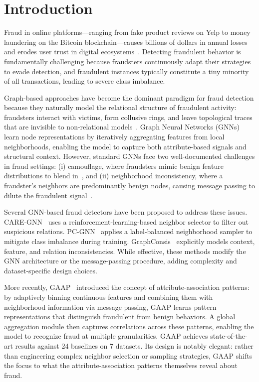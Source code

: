 \section{Introduction}
\label{sec:introduction}

Fraud in online platforms---ranging from fake product reviews on Yelp to money laundering on the Bitcoin blockchain---causes billions of dollars in annual losses and erodes user trust in digital ecosystems~\cite{wang2019fdgars}. Detecting fraudulent behavior is fundamentally challenging because fraudsters continuously adapt their strategies to evade detection, and fraudulent instances typically constitute a tiny minority of all transactions, leading to severe class imbalance.

Graph-based approaches have become the dominant paradigm for fraud detection because they naturally model the relational structure of fraudulent activity: fraudsters interact with victims, form collusive rings, and leave topological traces that are invisible to non-relational models~\cite{liu2020alleviating,dou2020enhancing}. Graph Neural Networks (GNNs)~\cite{kipf2016semi,velickovic2017graph,hamilton2017inductive} learn node representations by iteratively aggregating features from local neighborhoods, enabling the model to capture both attribute-based signals and structural context. However, standard GNNs face two well-documented challenges in fraud settings: (i) camouflage, where fraudsters mimic benign feature distributions to blend in~\cite{dou2020enhancing}, and (ii) neighborhood inconsistency, where a fraudster's neighbors are predominantly benign nodes, causing message passing to dilute the fraudulent signal~\cite{liu2020alleviating}.

Several GNN-based fraud detectors have been proposed to address these issues. CARE-GNN~\cite{dou2020enhancing} uses a reinforcement-learning-based neighbor selector to filter out suspicious relations. PC-GNN~\cite{liu2021pick} applies a label-balanced neighborhood sampler to mitigate class imbalance during training. GraphConsis~\cite{liu2020alleviating} explicitly models context, feature, and relation inconsistencies. While effective, these methods modify the GNN architecture or the message-passing procedure, adding complexity and dataset-specific design choices.

More recently, GAAP~\cite{duan2025global} introduced the concept of attribute-association patterns: by adaptively binning continuous features and combining them with neighborhood information via message passing, GAAP learns pattern representations that distinguish fraudulent from benign behaviors. A global aggregation module then captures correlations across these patterns, enabling the model to recognize fraud at multiple granularities. GAAP achieves state-of-the-art results against 24 baselines on 7 datasets. Its design is notably elegant: rather than engineering complex neighbor selection or sampling strategies, GAAP shifts the focus to what the attribute-association patterns themselves reveal about fraud.


